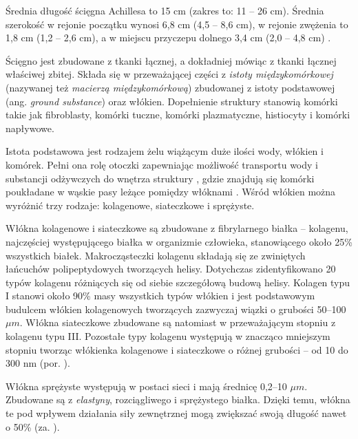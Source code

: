 Średnia długość ścięgna Achillesa to 15 cm (zakres to: 11 -- 26 cm). Średnia szerokość w rejonie początku wynosi 6,8 cm (4,5 -- 8,6 cm), w rejonie zwężenia to 1,8 cm (1,2 -- 2,6 cm), a w miejscu przyczepu dolnego 3,4 cm (2,0 -- 4,8 cm) \cite{Doral2010, KoivunenNiemel1995}.

Ścięgno jest zbudowane z tkanki łącznej, a dokładniej mówiąc z tkanki łącznej właściwej zbitej. Składa się w przeważającej części z \textit{istoty międzykomórkowej} (nazywanej też \textit{macierzą międzykomórkową}) zbudowanej z istoty podstawowej (ang. \textit{ground substance}) oraz włókien. Dopełnienie struktury stanowią komórki takie jak fibroblasty, komórki tuczne, komórki plazmatyczne, histiocyty i komórki napływowe. 

Istota podstawowa jest rodzajem żelu wiążącym duże ilości wody, włókien i komórek. Pełni ona rolę otoczki zapewniając możliwość transportu wody i substancji odżywczych do wnętrza struktury \cite{Sharma2006}, gdzie znajdują się komórki poukładane w wąskie pasy leżące pomiędzy włóknami \cite{Maffulli2005}. Wśród włókien można wyróżnić trzy rodzaje: kolagenowe, siateczkowe i sprężyste.

Włókna kolagenowe i siateczkowe są zbudowane z fibrylarnego białka -- kolagenu, najczęściej występującego białka w organizmie człowieka, stanowiącego około 25\% wszystkich białek. Makrocząsteczki kolagenu składają się ze zwiniętych łańcuchów polipeptydowych tworzących helisy. Dotychczas zidentyfikowano 20 typów kolagenu różniących się od siebie szczegółową budową helisy. Kolagen typu I stanowi około 90\% masy wszystkich typów włókien i jest podstawowym budulcem włókien kolagenowych tworzących zazwyczaj wiązki o grubości 50--100 $\mu$$m$. Włókna siateczkowe zbudowane są natomiast w przeważającym stopniu z kolagenu typu III. Pozostałe typy kolagenu występują w znacząco mniejszym stopniu tworząc włókienka kolagenowe i siateczkowe o różnej grubości -- od 10 do 300 nm (por. \cite{sawicki2008histologia}).

Włókna sprężyste występują w postaci sieci i mają średnicę 0,2--10 $\mu$$m$. Zbudowane są z \textit{elastyny}, rozciągliwego i sprężystego białka. Dzięki temu, włókna te pod wpływem działania siły zewnętrznej mogą zwiększać swoją długość nawet o 50\% (za. \cite{sawicki2008histologia}). 

